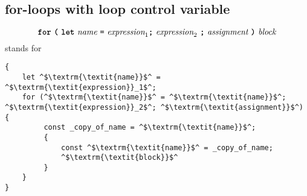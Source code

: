 \subsection*{for-loops with loop control variable}

\[\textbf{\texttt{for}}\ \textbf{\texttt{(}} \ 
\textbf{\texttt{let}}\ \textit{name}\ \texttt{=}\
\textit{expression}_1 \textbf{\texttt{;}} 
\ \textit{expression}_2 \ \textbf{\texttt{;}} \ \textit{assignment} \ \textbf{\texttt{)}} \ 
                                            \textit{block}
\]
stands for
\begin{center}
  \begin{minipage}{90mm}
  \begin{lstlisting}
{
    let ^$\textrm{\textit{name}}$^ = ^$\textrm{\textit{expression}}_1$^;
    for (^$\textrm{\textit{name}}$^ = ^$\textrm{\textit{name}}$^; ^$\textrm{\textit{expression}}_2$^; ^$\textrm{\textit{assignment}}$^) {
         const _copy_of_name = ^$\textrm{\textit{name}}$^;
         {
             const ^$\textrm{\textit{name}}$^ = _copy_of_name;
             ^$\textrm{\textit{block}}$^
         }
    }
}
  \end{lstlisting}
  \end{minipage}

\end{center}



